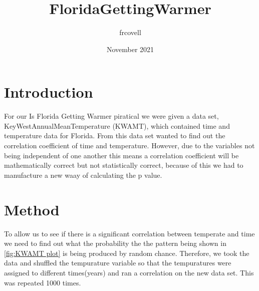 \documentclass{article}
\title{FloridaGettingWarmer}
\author{frcovell }
\date{November 2021}
\begin{document}
\maketitle

\section{Introduction}
For our Is Florida Getting Warmer piratical we were given a data set, KeyWestAnnualMeanTemperature (KWAMT), which contained time and temperature data for Florida. From this data set wanted to find out the correlation coefficient of time and temperature. However, due to the variables not being independent of one another this means a correlation coefficient will be mathematically correct but not statistically correct, because of this we  had to manufacture a new waay of calculating the p value.

\section{Method}
To allow us to see if there is a significant correlation between temperate and time we need to find out what the probability the the pattern being shown in \ref{fig:KWAMT plot} is being produced by random chance. Therefore, we took the data and shuffled the tempurature variable so that the tempuratures were assigned to different times(years) and ran a correlation on the new data set. This was repeated 1000 times.
\end{document}
